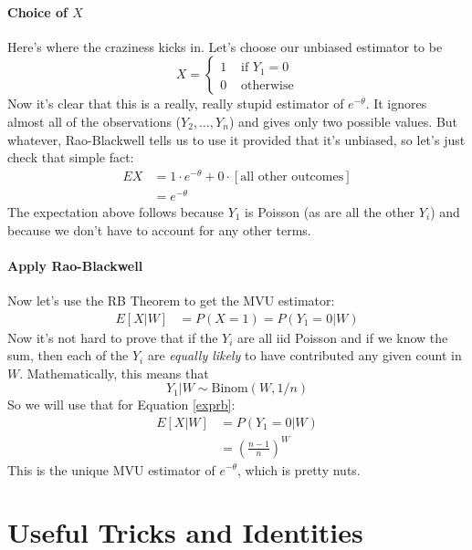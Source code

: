 \documentclass[a4paper,12pt]{scrartcl}
\begin{document}
\paragraph{Choice of $X$} Here's where the craziness kicks in. Let's
choose our unbiased estimator to be 
   \[ X=\begin{cases} 1 & \text{ if $Y_1 = 0$} \\ 0 &\text{ otherwise} 
      \end{cases} \]
Now it's clear that this is a really, really stupid estimator of
$e^{-\theta}$.  It ignores almost all of the observations 
($Y_2, \ldots, Y_n$) and gives only two possible values. But whatever,
Rao-Blackwell tells us to use it provided that it's unbiased, so 
let's just check that simple fact:
\begin{align*}
   EX &= 1 \cdot e^{-\theta} + 0 \cdot [\text{all other outcomes}] \\
   &=e^{-\theta}
\end{align*}
The expectation above follows because $Y_1$ is Poisson (as are all the
other $Y_i$) and because we don't have to account for any other terms.

\paragraph{Apply Rao-Blackwell} Now let's use the RB Theorem to get
the MVU estimator:
\begin{align}
   \label{exprb}
   E[X|W] &= P(X=1) = P(Y_1 = 0 | W) 
\end{align}
Now it's not hard to prove that if the $Y_i$ are all iid Poisson
and if we know the sum, then each of the $Y_i$ are \emph{equally 
likely} to have contributed any given count in $W$. Mathematically, 
this means that
   \[ Y_1 | W \sim \text{Binom}(W, 1/n) \]
So we will use that for Equation \ref{exprb}:
\begin{align*}
   E[X|W] &= P(Y_1 = 0 | W) \\
   &= \left(\frac{n-1}{n}\right)^W
\end{align*}
This is the unique MVU estimator of $e^{-\theta}$, which is pretty nuts.

\newpage
\section{Useful Tricks and Identities}
\end{document}
